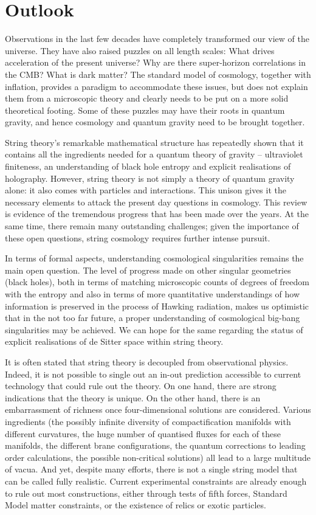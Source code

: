 \section{Outlook}

  Observations in the last few decades  have completely transformed our view of the universe. They  have also raised puzzles on 
  all length scales: What drives acceleration of the present universe? Why are there super-horizon correlations in the CMB? What is dark matter?  The standard model of cosmology, together with inflation, provides a paradigm to accommodate these issues, but does not explain them from a microscopic theory and clearly needs to be put on a more solid theoretical footing. Some of
 these puzzles may have their roots in quantum gravity, and hence cosmology and quantum gravity need to be brought together. 
 
 String theory's remarkable mathematical
 structure has repeatedly shown that it contains all the ingredients needed for a quantum theory of gravity --  ultraviolet finiteness, 
 an understanding of black hole entropy  and explicit realisations of holography. However, string theory is not simply a theory of quantum gravity alone: it also comes with particles
 and interactions. This unison gives it the necessary elements to attack the present day questions in cosmology.  This review
is evidence of the tremendous progress that has been made over the years. At the same time, there remain many outstanding challenges; given the importance of these open questions, string cosmology requires further intense pursuit. 
 
 In terms of formal aspects,  understanding cosmological singularities remains the main open question. The level of progress made on other singular geometries (black holes), both in terms of matching microscopic counts of degrees of freedom with the entropy and also in terms of more quantitative understandings of how information is preserved in the process of Hawking radiation, makes us  optimistic that in the not too far future, a proper understanding of cosmological big-bang singularities may be achieved. We can hope for the same regarding the status of explicit realisations of de Sitter space within string theory. 
 
 It is often stated that string theory is decoupled from observational physics. Indeed, it is not possible to single out an in-out prediction accessible to current technology  that could rule out the theory. On one hand, there are strong indications that the theory is unique. On the other hand, there is an embarrassment of richness  once four-dimensional solutions are considered. Various ingredients (the possibly infinite diversity of compactification manifolds with different curvatures,  the huge number of quantised fluxes for each of these manifolds, the different brane configurations, the quantum corrections to leading order calculations, the possible non-critical solutions) all lead to a large multitude of vacua.
 And yet, despite many efforts, there is not a single string model that can be called fully realistic. Current experimental constraints are already enough to rule out most constructions, either through tests of fifth forces, Standard Model matter constraints, or the existence of relics or exotic particles.
 
